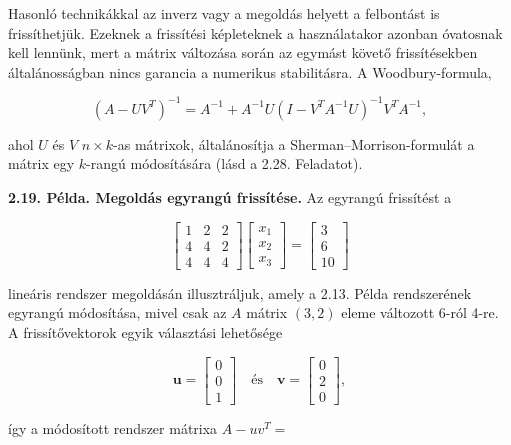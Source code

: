 \documentclass[
  magyar,
  11pt]{article}
\providecommand{\boldsymbol}[1]{\mathbf{#1}}
\begin{document}
Hasonló technikákkal az inverz vagy a megoldás helyett a felbontást is
frissíthetjük. Ezeknek a frissítési képleteknek a használatakor azonban
óvatosnak kell lennünk, mert a mátrix változása során az egymást követő
frissítésekben általánosságban nincs garancia a numerikus stabilitásra.
A Woodbury-formula,

\[(A - UV^T)^{-1} = A^{-1} + A^{-1}U(I - V^T A^{-1} U)^{-1} V^T A^{-1},\]

ahol \(U\) és \(V\) \(n \times k\)-as mátrixok, általánosítja a
Sherman--Morrison-formulát a mátrix egy \(k\)-rangú módosítására (lásd a
2.28. Feladatot).

\textbf{2.19. Példa. Megoldás egyrangú frissítése.} Az egyrangú
frissítést a

\[\begin{bmatrix} 1 & 2 & 2 \\ 4 & 4 & 2 \\ 4 & 4 & 4 \end{bmatrix} \begin{bmatrix} x_1 \\ x_2 \\ x_3 \end{bmatrix} = \begin{bmatrix} 3 \\ 6 \\ 10 \end{bmatrix}\]

lineáris rendszer megoldásán illusztráljuk, amely a 2.13. Példa
rendszerének egyrangú módosítása, mivel csak az \(A\) mátrix \((3, 2)\)
eleme változott 6-ról 4-re. A frissítővektorok egyik választási
lehetősége

\[\boldsymbol{u} = \begin{bmatrix} 0 \\ 0 \\ 1 \end{bmatrix} \quad \text{és} \quad \boldsymbol{v} = \begin{bmatrix} 0 \\ 2 \\ 0 \end{bmatrix},\]

így a módosított rendszer mátrixa \(A - uv^T =\)
\end{document}
